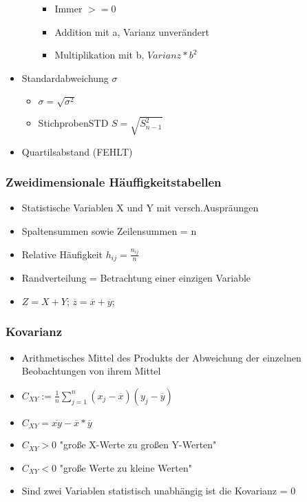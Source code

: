 \documentclass[a4paper]{article}
\begin{document}
\begin{landscape}
\begin{multicols}{4}
\begin{itemize}[noitemsep,nolistsep,leftmargin=*]
\begin{itemize}[noitemsep,nolistsep,leftmargin=*]
\begin{itemize}[noitemsep,nolistsep,leftmargin=*]
                    \item Immer $>= 0$
                    \item Addition mit a, Varianz unverändert
                    \item Multiplikation mit b, $Varianz * b^2$
                \end{itemize}
        \end{itemize}
        \item Standardabweichung $\sigma$
        \begin{itemize}[noitemsep,nolistsep,leftmargin=*]
            \item $\sigma = \sqrt{\sigma^2}$
            \item StichprobenSTD $S = \sqrt{S^2_{n-1}}$
        \end{itemize}
        \item Quartilsabstand (FEHLT)
    \end{itemize}

    \subsubsection*{Zweidimensionale Häuffigkeitstabellen}
    \begin{itemize}[noitemsep,nolistsep,leftmargin=*]
        \item Statistische Variablen X und Y mit versch.Auspräungen
        \item Spaltensummen sowie Zeilensummen = n
        \item Relative Häufigkeit $h_{ij} = \frac{n_{ij}}{n}$
        \item Randverteilung = Betrachtung einer einzigen Variable
        \item $ Z = X +Y$; $\overline{z} = \overline{x} + \overline{y}$; 
    \end{itemize}

    \subsubsection*{Kovarianz}
    \begin{itemize}[noitemsep,nolistsep,leftmargin=*]
        \item Arithmetisches Mittel des Produkts der Abweichung der einzelnen Beobachtungen von ihrem Mittel
        \item $C_{XY} := \frac{1}{n}\sum_{j = 1}^{n}{(x_j - \overline{x})(y_j - \overline{y})}$ 
        \item $C_{XY} = \overline{xy} - \overline{x}*\overline{y}$
        \item  $C_{XY} > 0$ "große X-Werte zu großen Y-Werten"
        \item $C_{XY} < 0$ "große Werte zu kleine Werten"
        \item Sind zwei Variablen statistisch unabhängig ist die Kovarianz = 0
    \end{itemize}


\end{multicols}
\end{landscape}
\end{document}
